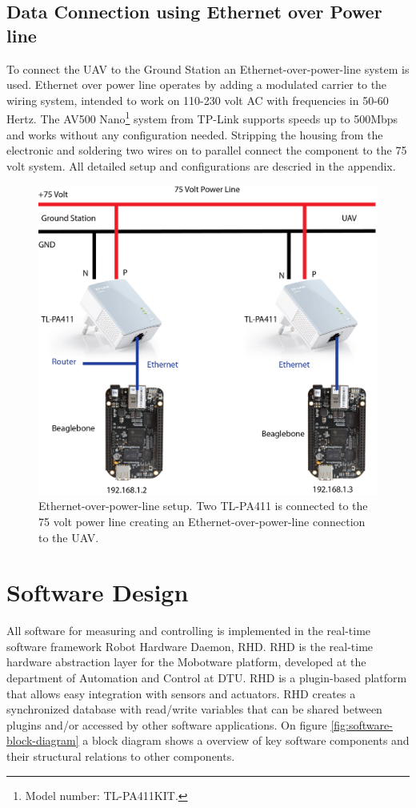 \newpage

\subsection{Data Connection using Ethernet over Power line}
To connect the UAV to the Ground Station an Ethernet-over-power-line system is used. Ethernet over power line operates by adding a modulated carrier to the wiring system, intended to work on 110-230 volt AC with frequencies in 50-60 Hertz. The AV500 Nano\footnote{Model number: TL-PA411KIT.} system from TP-Link supports speeds up to 500Mbps and works without any configuration needed. Stripping the housing from the electronic and soldering two wires on to parallel connect the component to the 75 volt system. All detailed setup and configurations are descried in the appendix.

\begin{figure}[hbtp]
\centering
\includegraphics[scale=0.75]{graphics/EthernetLink.png}
\caption[Ethernet-over-power-line setup]{Ethernet-over-power-line setup. Two TL-PA411 is connected to the 75 volt power line creating an Ethernet-over-power-line connection to the UAV.}
\label{fig:Networking}
\end{figure}



\section{Software Design}
All software for measuring and controlling is implemented in the real-time software framework Robot Hardware Daemon, RHD. RHD is the real-time hardware abstraction layer for the Mobotware platform, developed at the department of Automation and Control at DTU. RHD is a plugin-based platform that allows easy integration with sensors and actuators. RHD creates a synchronized database with read/write variables that can be shared between plugins and/or accessed by other software applications. On figure \ref{fig:software-block-diagram} a block diagram shows a overview of key software components and their structural relations to other components.

